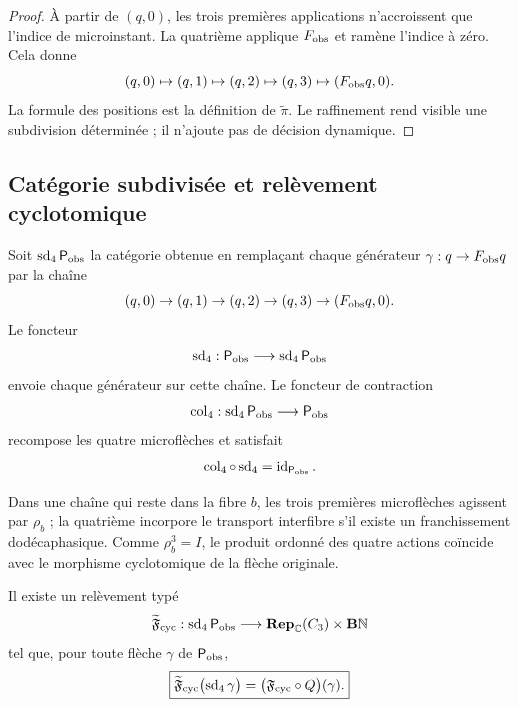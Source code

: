 \begin{proof}
À partir de \((q,0)\), les trois premières applications n’accroissent que l’indice
de microinstant. La quatrième applique \(F_{\rm obs}\) et ramène l’indice à
zéro. Cela donne
\[
 (q,0)\mapsto(q,1)\mapsto(q,2)\mapsto(q,3)
 \mapsto(F_{\rm obs}q,0).
\]
La formule des positions est la définition de
\(\widetilde\pi\). Le raffinement rend visible une subdivision déterminée ;
il n’ajoute pas de décision dynamique.
\end{proof}

\subsection{Catégorie subdivisée et relèvement cyclotomique}

Soit \(\operatorname{sd}_4\mathsf P_{\rm obs}\) la catégorie obtenue en
remplaçant chaque générateur
\(\gamma:q\to F_{\rm obs}q\) par la chaîne
\begin{equation}
 (q,0)\to(q,1)\to(q,2)\to(q,3)\to(F_{\rm obs}q,0).
 \label{p12-83-c1-s12:eq:u006c-cadena-subdivision}
\end{equation}
Le foncteur
\[
 \operatorname{sd}_4:
 \mathsf P_{\rm obs}\longrightarrow
 \operatorname{sd}_4\mathsf P_{\rm obs}
\]
envoie chaque générateur sur cette chaîne. Le foncteur de contraction
\[
 \operatorname{col}_4:
 \operatorname{sd}_4\mathsf P_{\rm obs}
 \longrightarrow\mathsf P_{\rm obs}
\]
recompose les quatre microflèches et satisfait
\begin{equation}
 \operatorname{col}_4\circ\operatorname{sd}_4
 =\operatorname{id}_{\mathsf P_{\rm obs}}.
 \label{p12-83-c1-s12:eq:u006c-colapso}
\end{equation}

Dans une chaîne qui reste dans la fibre \(b\), les trois premières
microflèches agissent par \(\rho_b\) ; la quatrième incorpore le transport
interfibre s’il existe un franchissement dodécaphasique. Comme \(\rho_b^3=I\), le produit
ordonné des quatre actions coïncide avec le morphisme cyclotomique de la
flèche originale.

\begin{proposition}
\label{p12-83-c1-s12:prop:u006c-invariancia-ciclotomica}
Il existe un relèvement typé
\[
 \widetilde{\mathfrak F}_{\rm cyc}:
 \operatorname{sd}_4\mathsf P_{\rm obs}
 \longrightarrow
 \mathbf{Rep}_{\mathbb C}(C_3)\times\mathbf B\mathbb N
\]
tel que, pour toute flèche \(\gamma\) de
\(\mathsf P_{\rm obs}\),
\begin{equation}
 \boxed{
 \widetilde{\mathfrak F}_{\rm cyc}
 \bigl(\operatorname{sd}_4\gamma\bigr)
 =
 \bigl(\mathfrak F_{\rm cyc}\circ Q\bigr)(\gamma).}
 \label{p12-83-c1-s12:eq:u006c-invariancia-ciclotomica}
\end{equation}
\end{proposition}

